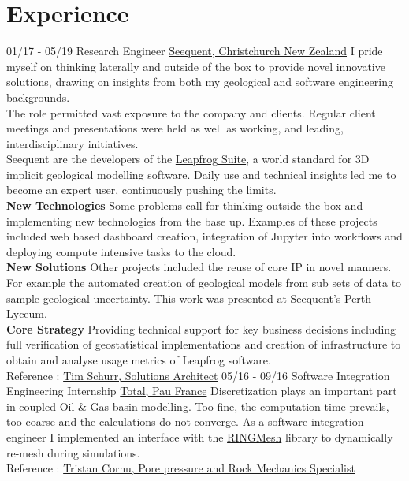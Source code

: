 \documentclass[]{friggeri-cv}
\begin{document}
\section{Experience}
\begin{entrylist}
  \entry
    {01/17 - 05/19}
    {Research Engineer}
    {\href{https://www.seequent.com/}{Seequent, Christchurch New Zealand}}
    {I pride myself on thinking laterally and outside of the box to provide novel innovative solutions, drawing on insights from both my geological and software engineering backgrounds.
    \\[3pt]
    The role permitted vast exposure to the company and clients. Regular client meetings and presentations were held as well as working, and leading, interdisciplinary initiatives.
    \\[3pt]
    Seequent are the developers of the \href{https://www.leapfrog3d.com/}{Leapfrog Suite}, a world standard for 3D implicit geological modelling software. Daily use and technical insights led me to become an expert user, continuously pushing the limits.
    \\[6pt]
   	\textbf{New Technologies} Some problems call for thinking outside the box and implementing new technologies from the base up. Examples of these projects included web based dashboard creation, integration of Jupyter into workflows and deploying compute intensive tasks to the cloud.
   	\\[6pt]
   	\textbf{New Solutions} Other projects included the reuse of core IP in novel manners. For example the automated creation of geological models from sub sets of data to sample geological uncertainty. This work was presented at Seequent's \href{https://www.youtube.com/watch?v=jt26J5ljlA0}{Perth Lyceum}.
    \\[6pt]
   	\textbf{Core Strategy} Providing technical support for key business decisions including full verification of geostatistical implementations and creation of infrastructure to obtain and analyse usage metrics of Leapfrog software. 
    \\
    Reference : \href{mailto:tim.schurr@seequent.com}{Tim Schurr, Solutions Architect}
	}
  \entry
    {05/16 - 09/16}
    {Software Integration Engineering Internship}
    {\href{https://www.total.com/en}{Total, Pau France}}
    {Discretization plays an important part in coupled Oil \& Gas basin modelling. Too fine, the computation time prevails, too coarse and the calculations do not converge. As a software integration engineer I implemented an interface with the \href{http://www.ring-team.org/software/ringmesh}{RINGMesh} library to dynamically re-mesh during simulations.\\ Reference : \href{mailto:tristan.cornu@total.com}{Tristan Cornu, Pore pressure and Rock Mechanics Specialist}}
    \end{entrylist}
    
\end{document}
